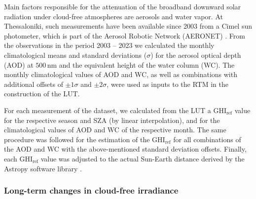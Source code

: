 \documentclass[preprint, 5p,
authoryear]{elsarticle} %
\begin{document}
Main factors responsible for the attenuation of the broadband downward
solar radiation under cloud-free atmospheres are aerosols and water
vapor. At Thessaloniki, such measurements have been available since 2003
from a Cimel sun photometer, which is part of the Aerosol Robotic
Network (AERONET) \citep{Giles2019, Buis1998}. From the observations in
the period 2003 -- 2023 we calculated the monthly climatological means
and standard deviations (\(\sigma\)) for the aerosol optical depth (AOD)
at \(500\,\text{nm}\) and the equivalent height of the water column
(WC). The monthly climatological values of AOD and WC, as well as
combinations with additional offsets of \(\pm1\sigma\) and
\(\pm2\sigma\), were used as inputs to the RTM in the construction of
the LUT.

For each measurement of the dataset, we calculated from the LUT a
\(\text{GHI}_\text{ref}\) value for the respective season and SZA (by
linear interpolation), and for the climatological values of AOD and WC
of the respective month. The same procedure was followed for the
estimation of the \(\text{GHI}_\text{ref}\) for all combinations of the
AOD and WC with the above-mentioned standard deviation offsets. Finally,
each \(\text{GHI}_\text{ref}\) value was adjusted to the actual
Sun-Earth distance derived by the Astropy software library
\citep{AstropyCollaboration2022}.

\hypertarget{long-term-changes-in-cloud-free-irradiance}{%
\subsubsection{Long-term changes in cloud-free
irradiance}\label{long-term-changes-in-cloud-free-irradiance}}
\end{document}
